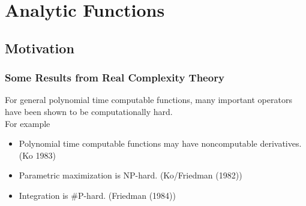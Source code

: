 \documentclass[xcolor=pdftex,dvipsnames,table]{beamer}
\begin{document}
\section{Analytic Functions}
\subsection{Motivation}
\begin{frame}
\frametitle{Some Results from Real Complexity Theory}
  \begin{tcolorbox}[colback=yellow!5,title=Fact,colframe=blue!75!black]

For general polynomial time computable functions, many important operators have been shown to be computationally hard.\\
For example
\begin{itemize}[<+->]
\item Polynomial time computable functions may have noncomputable derivatives. (Ko 1983)
\item Parametric maximization is NP-hard. (Ko/Friedman (1982))
\item Integration is \#P-hard. (Friedman (1984))
\end{itemize}
\end{tcolorbox}
\end{frame}
\end{document}
